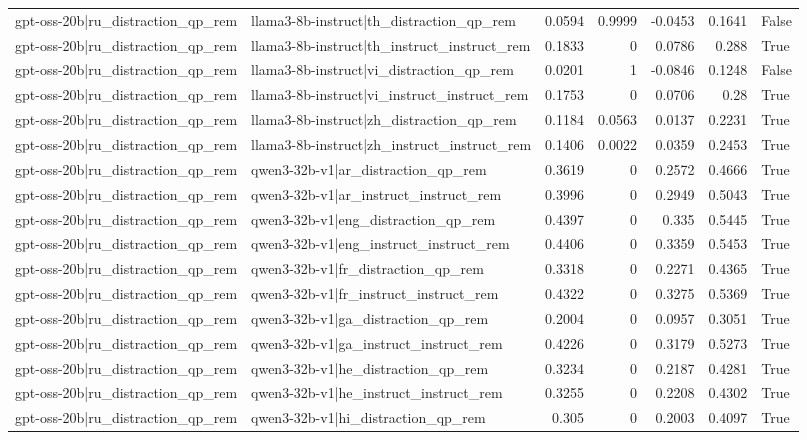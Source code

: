 \begin{table}
\begin{tabular}{l l r r r r l}
gpt-oss-20b|ru_distraction_qp_rem & llama3-8b-instruct|th_distraction_qp_rem & 0.0594 & 0.9999 & -0.0453 & 0.1641 & False \\
gpt-oss-20b|ru_distraction_qp_rem & llama3-8b-instruct|th_instruct_instruct_rem & 0.1833 & 0 & 0.0786 & 0.288 & True \\
gpt-oss-20b|ru_distraction_qp_rem & llama3-8b-instruct|vi_distraction_qp_rem & 0.0201 & 1 & -0.0846 & 0.1248 & False \\
gpt-oss-20b|ru_distraction_qp_rem & llama3-8b-instruct|vi_instruct_instruct_rem & 0.1753 & 0 & 0.0706 & 0.28 & True \\
gpt-oss-20b|ru_distraction_qp_rem & llama3-8b-instruct|zh_distraction_qp_rem & 0.1184 & 0.0563 & 0.0137 & 0.2231 & True \\
gpt-oss-20b|ru_distraction_qp_rem & llama3-8b-instruct|zh_instruct_instruct_rem & 0.1406 & 0.0022 & 0.0359 & 0.2453 & True \\
gpt-oss-20b|ru_distraction_qp_rem & qwen3-32b-v1|ar_distraction_qp_rem & 0.3619 & 0 & 0.2572 & 0.4666 & True \\
gpt-oss-20b|ru_distraction_qp_rem & qwen3-32b-v1|ar_instruct_instruct_rem & 0.3996 & 0 & 0.2949 & 0.5043 & True \\
gpt-oss-20b|ru_distraction_qp_rem & qwen3-32b-v1|eng_distraction_qp_rem & 0.4397 & 0 & 0.335 & 0.5445 & True \\
gpt-oss-20b|ru_distraction_qp_rem & qwen3-32b-v1|eng_instruct_instruct_rem & 0.4406 & 0 & 0.3359 & 0.5453 & True \\
gpt-oss-20b|ru_distraction_qp_rem & qwen3-32b-v1|fr_distraction_qp_rem & 0.3318 & 0 & 0.2271 & 0.4365 & True \\
gpt-oss-20b|ru_distraction_qp_rem & qwen3-32b-v1|fr_instruct_instruct_rem & 0.4322 & 0 & 0.3275 & 0.5369 & True \\
gpt-oss-20b|ru_distraction_qp_rem & qwen3-32b-v1|ga_distraction_qp_rem & 0.2004 & 0 & 0.0957 & 0.3051 & True \\
gpt-oss-20b|ru_distraction_qp_rem & qwen3-32b-v1|ga_instruct_instruct_rem & 0.4226 & 0 & 0.3179 & 0.5273 & True \\
gpt-oss-20b|ru_distraction_qp_rem & qwen3-32b-v1|he_distraction_qp_rem & 0.3234 & 0 & 0.2187 & 0.4281 & True \\
gpt-oss-20b|ru_distraction_qp_rem & qwen3-32b-v1|he_instruct_instruct_rem & 0.3255 & 0 & 0.2208 & 0.4302 & True \\
gpt-oss-20b|ru_distraction_qp_rem & qwen3-32b-v1|hi_distraction_qp_rem & 0.305 & 0 & 0.2003 & 0.4097 & True \\

\end{tabular}
\end{table}
